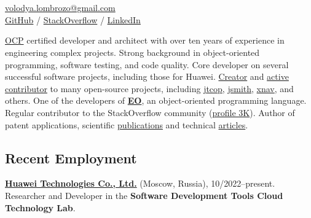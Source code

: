 \documentclass{vl}
\begin{document}
    \vlPrintPhoto{}

    \section*{\Large {}}

    \href{mailto:volodya.lombrozo@gmail.com}{volodya.lombrozo@gmail.com}\\%
    \href{https://github.com/volodya-lombrozo}{GitHub} /
    \href{https://stackoverflow.com/users/10423604/volodya-lombrozo}{StackOverflow} /
    \href{https://www.linkedin.com/in/vladimir-zakharov-lombrozo-b71744216/}{LinkedIn}

    \vspace*{12pt}

    \href{https://catalog-education.oracle.com/pls/certview/sharebadge?id=87F6A2FE819A5A5AF4120A05900AB28A461EE9A3EE9FBFA02721FADAEB3BCE19}{OCP}
    certified developer and architect with over ten years of experience in engineering complex projects.
    Strong background in object-oriented programming, software testing, and code quality.
    Core developer on several successful software projects, including those for Huawei.
    \href{https://github.com/volodya-lombrozo?tab=repositories}{Creator} and
    \href{https://github.com/volodya-lombrozo}{active contributor} to many open-source projects, including
    \href{https://github.com/volodya-lombrozo/jtcop}{jtcop},
    \href{https://github.com/volodya-lombrozo/jsmith}{jsmith},
    \href{https://github.com/volodya-lombrozo/xnav}{xnav}, and others.
    One of the developers of \textbf{\href{https://www.eolang.org}{EO}}, an object-oriented programming language.
    Regular contributor to the StackOverflow community
    (\href{https://stackoverflow.com/users/10423604/volodya-lombrozo}{profile 3K}).
    Author of patent applications, scientific \href{https://arxiv.org/abs/2410.05631}{publications} and technical
    \href{https://dzone.com/users/4993224/volodya-lombrozo.html}{articles}.

    \subsection*{Recent Employment}

    \textbf{\href{https://www.huawei.com}{Huawei Technologies Co., Ltd.}} (Moscow, Russia), 10/2022--present.
    Researcher and Developer in the \textbf{Software Development Tools Cloud Technology Lab}.
\end{document}
